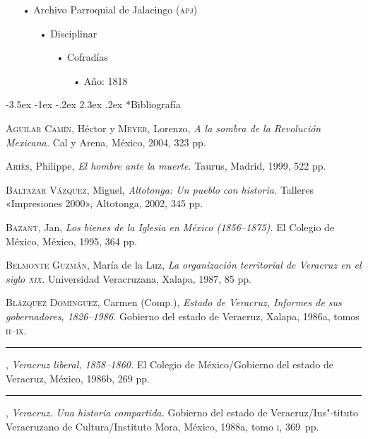 \documentclass[14pt,twoside,final]{extbook} %
\makeatletter
\renewcommand\section{\@startsection {section}{1}{\z@}%
                                     {-3.5ex \@plus -1ex \@minus -.2ex}%
                                     {2.3ex \@plus .2ex}%
                                     {\normalfont\large\bfseries\sc}}
\makeatother
\begin{document}
\begin{itemize}[noitemsep]
\item[•]Archivo Parroquial de Jalacingo (\textsc{apj})
\begin{itemize}[noitemsep]
\item[•]Disciplinar
\begin{itemize}[noitemsep]
\item[•]Cofradías
\begin{itemize}[noitemsep]
\item[•]Año: 1818
\end{itemize}
\end{itemize}
\end{itemize}
\end{itemize}
\section*{Bibliografía}
\label{sec:bibliografia}
\textsc{Aguilar Camín}, Héctor y \textsc{Meyer}, Lorenzo, \emph{A la sombra de la Revolución Mexicana.} Cal y Arena, México, 2004, 323 pp.

\textsc{Ariès}, Philippe, \emph{El hombre ante la muerte.} Taurus, Madrid, 1999, 522 pp.

\textsc{Baltazar Vázquez}, Miguel, \emph{Altotonga: Un pueblo con historia.} Talleres «Impresiones 2000», Altotonga, 2002, 345 pp.

\textsc{Bazant}, Jan, \emph{Los bienes de la Iglesia en México (1856--1875).} El Colegio de México, México, 1995, 364 pp.

\textsc{Belmonte Guzmán}, María de la Luz, \emph{La organización territorial de Veracruz en el siglo \textsc{xix}.} Universidad Veracruzana, Xalapa, 1987, 85 pp.

\textsc{Blázquez Domínguez}, Carmen (Comp.), \emph{Estado de Veracruz, Informes de sus gobernadores, 1826--1986.} Gobierno del estado de Veracruz, Xalapa, 1986a, tomos \textsc{ii--ix}.

\rule{1cm}{0.4pt}, \emph{Veracruz liberal, 1858--1860.} El Colegio de México/Gobierno del estado de Veracruz, México, 1986b, 269 pp.

\rule{1cm}{0.4pt}, \emph{Veracruz. Una historia compartida.} Gobierno del estado de Veracruz/Ins"-tituto Veracruzano de Cultura/Instituto Mora, México, 1988a, tomo \textsc{i}, 369~pp.
\end{document}
